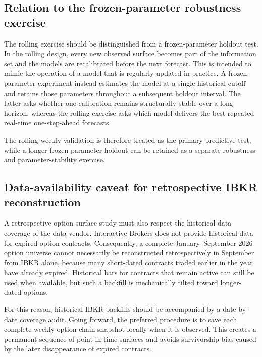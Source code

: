 \subsection{Relation to the frozen-parameter robustness exercise}
\label{subsec:frozen_robustness}

The rolling exercise should be distinguished from a frozen-parameter holdout
test.  In the rolling design, every new observed surface becomes part of the
information set and the models are recalibrated before the next forecast.  This
is intended to mimic the operation of a model that is regularly updated in
practice.  A frozen-parameter experiment instead estimates the model at a
single historical cutoff and retains those parameters throughout a subsequent
holdout interval.  The latter asks whether one calibration remains structurally
stable over a long horizon, whereas the rolling exercise asks which model
delivers the best repeated real-time one-step-ahead forecasts.

The rolling weekly validation is therefore treated as the primary predictive
test, while a longer frozen-parameter holdout can be retained as a separate
robustness and parameter-stability exercise.

\subsection{Data-availability caveat for retrospective IBKR reconstruction}
\label{subsec:ibkr_caveat}

A retrospective option-surface study must also respect the historical-data
coverage of the data vendor.  Interactive Brokers does not provide historical
data for expired option contracts.  Consequently, a complete January--September
2026 option universe cannot necessarily be reconstructed retrospectively in
September from IBKR alone, because many short-dated contracts traded earlier in
the year have already expired.  Historical bars for contracts that remain
active can still be used when available, but such a backfill is mechanically
tilted toward longer-dated options.

For this reason, historical IBKR backfills should be accompanied by a
date-by-date coverage audit.  Going forward, the preferred procedure is to save
each complete weekly option-chain snapshot locally when it is observed.  This
creates a permanent sequence of point-in-time surfaces and avoids survivorship
bias caused by the later disappearance of expired contracts.
